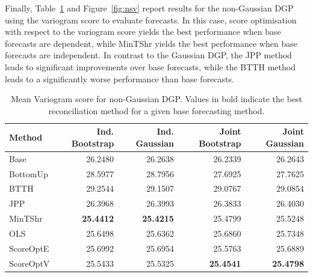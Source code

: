 \documentclass[11pt]{article}
\theoremstyle{definition}
\begin{document}
Finally, Table~\ref{tab:nsv} and Figure~\ref{fig:nsv} report results for the non-Gaussian DGP using the variogram score to evaluate forecasts. In this case, score optimisation with respect to the variogram score yields the best performance when base forecasts are dependent, while MinTShr yields the best performance when base forecasts are independent. In contrast to the Gaussian DGP, the JPP method leads to significant improvements over base forecasts, while the BTTH method leads to a significantly worse performance than base forecasts.

\begin{table}[H]
	\footnotesize
	\caption{\label{tab:nsv}Mean Variogram score for non-Gaussian DGP\@. Values in bold indicate the best reconciliation method for a given base forecasting method.}
	\centering
	\begin{tabular}[t]{lrrrr}
		\toprule
    Method    & Ind. Bootstrap   & Ind. Gaussian    & Joint Bootstrap  & Joint Gaussian\\
		\midrule
    Base      & 26.2480          & 26.2638          & 26.2339          & 26.2643\\
    BottomUp  & 28.5977          & 28.7956          & 27.6925          & 27.7625\\
    BTTH      & 29.2544          & 29.1507          & 29.0767          & 29.0854\\
    JPP       & 26.3968          & 26.3993          & 26.3833          & 26.4030\\
    MinTShr   & \textbf{25.4412} & \textbf{25.4215} & 25.4799          & 25.5248\\
    OLS       & 25.6498          & 25.6362          & 25.6860          & 25.7348\\
    ScoreOptE & 25.6992          & 25.6954          & 25.5763          & 25.6889\\
    ScoreOptV & 25.5433          & 25.5325          & \textbf{25.4541} & \textbf{25.4798}\\
		\bottomrule
	\end{tabular}
\end{table}
\end{document}
